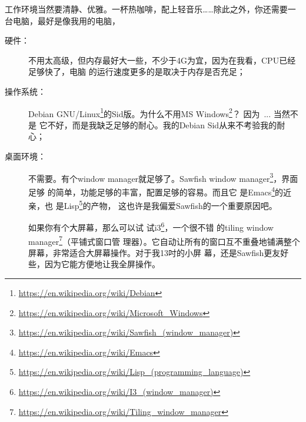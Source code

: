 \documentclass{swfcthesis}
\begin{document}
工作环境当然要清静、优雅。一杯热咖啡，配上轻音乐……除此之外，你还需要一台电脑，最好是像我用的电脑，
\begin{description}
\item[硬件：]不用太高级，但内存最好大一些，不少于4G为宜，因为在我看，CPU已经足够快了，电脑
  的运行速度更多的是取决于内存是否充足；
\item[操作系统：]Debian
  GNU/Linux\footnote{\url{https://en.wikipedia.org/wiki/Debian}}的Sid版。为什么不用MS
  Windows\footnote{\url{https://en.wikipedia.org/wiki/Microsoft_Windows}}？ 因为~... 当然不是
  它不好，而是我缺乏足够的耐心。我的Debian Sid从来不考验我的耐心；
\item[桌面环境：]不需要。有个window manager就足够了。Sawfish window
  manager\footnote{\url{https://en.wikipedia.org/wiki/Sawfish_(window_manager)}}，界面足够
  的简单，功能足够的丰富，配置足够的容易。而且它
  是Emacs\footnote{\url{https://en.wikipedia.org/wiki/Emacs}}的近亲，也
  是Lisp\footnote{\url{https://en.wikipedia.org/wiki/Lisp_(programming_language)}}的产物，
  这也许是我偏爱Sawfish的一个重要原因吧。

  如果你有个大屏幕，那么可以试
  试i3\footnote{\url{https://en.wikipedia.org/wiki/I3_(window_manager)}}，一个很不错
  的tiling window
  manager\footnote{\url{https://en.wikipedia.org/wiki/Tiling_window_manager}}（平铺式窗口管
  理器）。它自动让所有的窗口互不重叠地铺满整个屏幕，非常适合大屏幕操作。对于我13吋的小屏
  幕，还是Sawfish更友好些，因为它能方便地让我全屏操作。


\end{description}
\end{document}
